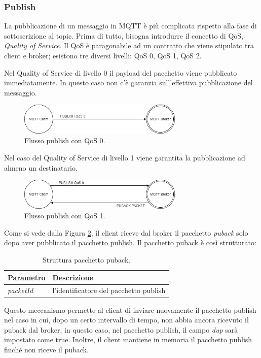 \documentclass[Lau,binding=0.6cm,noexaminfo=true]{sapthesis}
\begin{document}
\begin{large}
\subsubsection{Publish}
La pubblicazione di un messaggio in MQTT è più complicata rispetto alla fase di sottoscrizione al topic. Prima di tutto, bisogna introdurre il concetto di QoS, \textit{Quality of Service}. Il QoS è paragonabile ad un contratto che viene stipulato tra client e broker; esistono tre diversi livelli: QoS 0, QoS 1, QoS 2.


Nel Quality of Service di livello 0 il payload del pacchetto viene pubblicato immediatamente. In questo caso non c'è garanzia sull'effettiva pubblicazione del messaggio.
\begin{figure}[h]
\centering
\includegraphics[width=0.7\textwidth]{images/publish-qos0.png}
\caption{Flusso publish con QoS 0.}
\label{fig:qos-0pub}
\end{figure}

Nel caso del Quality of Service di livello 1 viene garantita la pubblicazione ad almeno un destinatario.
\begin{figure}[h]
\centering
\includegraphics[width=0.7\textwidth]{images/publish-qos1.png}
\caption{Flusso publish con QoS 1.}
\label{fig:qos-1pub}
\end{figure}

Come si vede dalla Figura \ref{fig:qos-1pub}, il client riceve dal broker il pacchetto \textit{puback} solo dopo aver pubblicato il pacchetto publish. 
Il pacchetto puback è così strutturato:
\begin{table}[h]
\caption{Struttura pacchetto puback.}
\label{tab:puback}
\begin{tabular}{lp{}}
\toprule
\textbf{Parametro} & \textbf{Descrizione} \\
\midrule
\textit{packetId} & l'identificatore del pacchetto publish \\
\bottomrule
\end{tabular}
\end{table}

Questo meccanismo permette al client di inviare nuovamente il pacchetto publish nel caso in cui, dopo un certo intervallo di tempo, non abbia ancora ricevuto il puback dal broker; in questo caso, nel pacchetto publish, il campo \textit{dup} sarà impostato come true. Inoltre, il client mantiene in memoria il pacchetto publish finché non riceve il puback.


\end{large}
\end{document}
